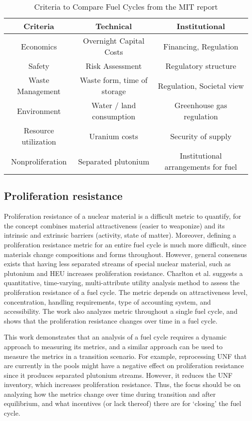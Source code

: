 \begin{table}[h]
    \centering
    \label{tab:mit}
    \caption{Criteria to Compare Fuel Cycles from the MIT report \cite{kazimi_future_2011}}
    \begin{tabular}{ccc}
        \hline
        \textbf{Criteria} & \textbf{Technical} & \textbf{Institutional}\\ \hline
        Economics & Overnight Capital Costs & Financing, Regulation \\
        Safety & Risk Assessment & Regulatory structure \\
        Waste Management & Waste form, time of storage & Regulation, Societal view \\
        Environment & Water / land consumption & Greenhouse gas regulation \\
        Resource utilization & Uranium costs & Security of supply \\
        Nonproliferation & Separated plutonium & Institutional arrangements for fuel \\
        \hline
    \end{tabular}
\end{table}

\subsection{Proliferation resistance}

Proliferation resistance of a nuclear material is a difficult
metric to quantify,
for the concept combines material attractiveness (easier to weaponize)
and its intrinsic and extrinsic barriers (activity, state of matter).
Moreover, defining a proliferation resistance metric for an
entire fuel cycle is much more difficult, since materials change
compositions and forms throughout. However, general consensus exists
that having less separated streams of special nuclear material, such
as plutonium and \gls{HEU} increases proliferation resistance.
Charlton et al. \cite{charlton_proliferation_2007} suggests a
quantitative, time-varying, multi-attribute utility analysis method
to assess the proliferation resistance of a fuel cycle. The metric
depends on attractiveness level, concentration, handling requirements,
type of accounting system, and accessibility. The work also analyzes
metric throughout a single fuel cycle, and shows that the proliferation
resistance changes over time in a fuel cycle.

This work demonstrates that an analysis of a fuel cycle requires
a dynamic approach to measuring its metrics, and a similar approach
can be used to measure the metrics in a transition scenario.
For example, reprocessing \gls{UNF} that are currently in the
pools might have a negative effect on proliferation resistance
since it produces separated plutonium streams. However, it reduces
the \gls{UNF} inventory, which increases proliferation resistance.
Thus, the focus should be on analyzing how the metrics change
over time during transition and after equilibrium, and what
incentives (or lack thereof) there are for `closing' the fuel cycle.

